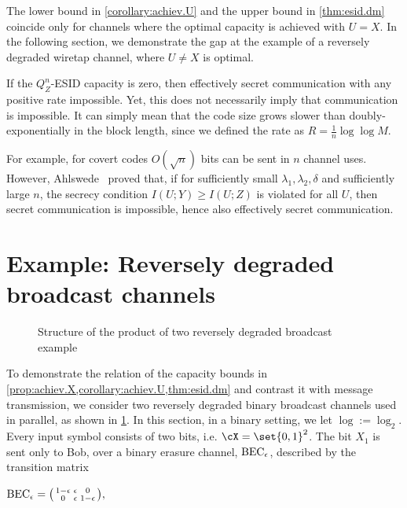 \documentclass[conference,final]{IEEEtran}
\begin{document}
\begin{remark}
  The lower bound in \cref{corollary:achiev.U}
  and the upper bound in \cref{thm:esid.dm} coincide only
  for channels where the optimal capacity is achieved
  with $U = X$.
  In the following section, we demonstrate the gap
  at the example of a reversely degraded wiretap channel,
  where $U \ne X$ is optimal.
\end{remark}
\begin{remark}
  If the $Q_Z^n$-ESID capacity is zero,
  then effectively secret communication with any positive rate
  impossible.
  Yet, this does not necessarily imply that communication is
  impossible. It can simply mean that the code size grows slower than
  doubly-exponentially in the block length, since we defined the
  rate as $R = \frac{1}{n} \log\log M$.
  
  For example, for covert codes $O(\sqrt n)$ bits can be sent in $n$ channel uses.  However,
  Ahlswede~\cite[Lemmas 89, 90 and Remark 92]{Ahlswede2021IdenticationOtherProbabilistic}
  proved that, if for sufficiently small $\lambda_1,\lambda_2,\delta$
  and sufficiently large $n$,
  the secrecy condition $I(U; Y) \ge I(U; Z)$ is
  violated for all $U$, then secret communication is impossible,
  hence also effectively secret communication.
\end{remark}

\section{Example: Reversely degraded broadcast channels}
\label{sec:example}

\begin{figure}
    \centering
    \exampleChannelESID[xscale=1.1,yscale=0.5][1]
    \caption{\label{fig:revDegraded}
      Structure of the product of two reversely degraded broadcast example 
      }
\end{figure}
To demonstrate the relation of the capacity bounds in
\cref{prop:achiev.X,corollary:achiev.U,thm:esid.dm}
and contrast it with message transmission,
we consider two reversely degraded binary broadcast channels
used in parallel,
as shown in \cref{fig:revDegraded}.
In this section, in a binary setting, we let $\log := \log_2$.
Every input symbol consists of two bits,
i.e. $\cX = \set{ 0,1 }^2$.
The bit $X_1$ is sent only to Bob,
over a binary erasure channel, $\operatorname{BEC}_\epsilon$,
described by the transition matrix

$
  \BEC_\epsilon =
  \mleft(\begin{smallmatrix}
    1 - \epsilon  & \epsilon & 0 \\
    0  & \epsilon & 1 - \epsilon
  \end{smallmatrix}\mright),
  $
\end{document}
